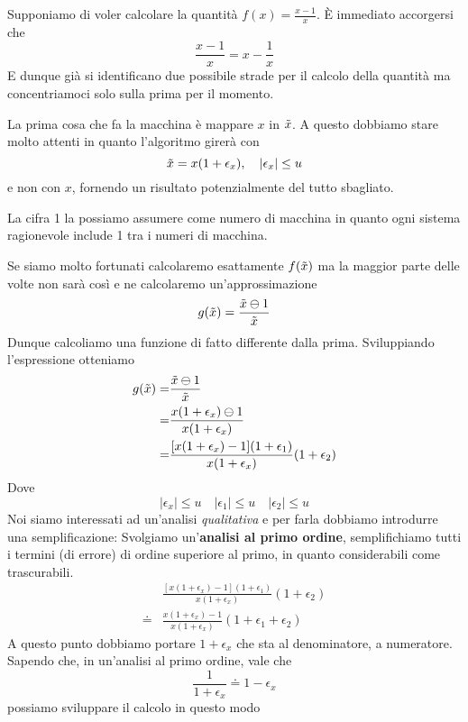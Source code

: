 \begin{example}
	Supponiamo di voler calcolare la quantità $f(x) = \frac{x - 1}{x}$. \`E immediato accorgersi che
	\[ \frac{x - 1}{x} = x - \frac{1}{x} \]
	E dunque già si identificano due possibile strade per il calcolo della quantità ma concentriamoci solo
	sulla prima per il momento.

	La prima cosa che fa la macchina è mappare $x$ in $\tilde{x}$. A questo dobbiamo stare molto attenti in
	quanto l'algoritmo girerà con
	\[ \tilde{x} = x (1 + \epsilon_x), \quad |\epsilon_x| \leq u \]
	e non con $x$, fornendo un risultato potenzialmente del tutto sbagliato.

	La cifra 1 la possiamo assumere come numero di macchina in quanto ogni sistema ragionevole include 1 tra
	i numeri di macchina.

	Se siamo molto fortunati calcolaremo esattamente $f(\tilde{x})$ ma la maggior parte delle volte non sarà
	così e ne calcolaremo un'approssimazione
	\[ g(\tilde{x}) = \frac{\tilde{x} \ominus 1}{\tilde{x}} \]
	Dunque calcoliamo una funzione di fatto differente dalla prima. Sviluppiando l'espressione otteniamo
	\begin{align*}
		g(\tilde{x})  = & \frac{\tilde{x} \ominus 1}{\tilde{x}}                                                            \\
		=         & \frac{x (1 + \epsilon_x) \ominus 1}{x (1 + \epsilon_x)}                              \\
		=         & \frac{[x (1 + \epsilon_x) - 1](1 + \epsilon_1)}{x (1 + \epsilon_x)} (1 + \epsilon_2)
	\end{align*}
	Dove
	\[ |\epsilon_x| \leq u \quad |\epsilon_1| \leq u \quad |\epsilon_2| \leq u \]
	Noi siamo interessati ad un'analisi \emph{qualitativa} e per farla dobbiamo introdurre una semplificazione:
	Svolgiamo un'\textbf{analisi al primo ordine}, semplifichiamo tutti i termini (di errore) di ordine superiore
	al primo, in quanto considerabili come trascurabili.
	\begin{align*}
		       & \frac{[x (1 + \epsilon_x) - 1](1 + \epsilon_1)}{x (1 + \epsilon_x)} (1 + \epsilon_2) \\
		\doteq & \frac{x (1 + \epsilon_x) - 1}{x (1 + \epsilon_x)} (1 + \epsilon_1 + \epsilon_2)
	\end{align*}
	A questo punto dobbiamo portare $1 + \epsilon_x$ che sta al denominatore, a numeratore. Sapendo che, in
	un'analisi al primo ordine, vale che
	\[ \frac{1}{1 + \epsilon_x} \doteq 1 - \epsilon_x \]
	possiamo sviluppare il calcolo in questo modo
	\begin{align*}

\end{align*}
\end{example}
